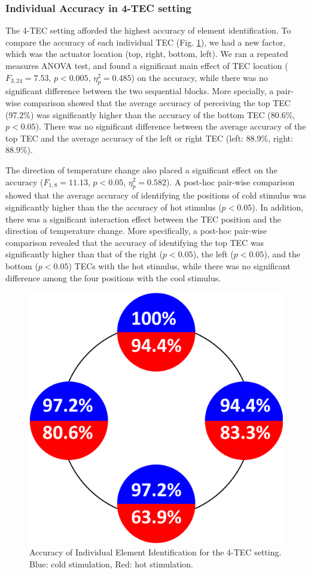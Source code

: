 \documentclass[preprint,12pt]{elsarticle}
\begin{document}
\subsubsection{Individual Accuracy in 4-TEC setting}
The 4-TEC setting afforded the highest accuracy of element identification. To compare the accuracy of each individual TEC (Fig. \ref{fig:7}), we had a new factor, which was the actuator location (top, right, bottom, left).
We ran a repeated measures ANOVA test, and found a significant main effect of TEC location ($F_{3,24} = 7.53$, $p < 0.005$, $\eta_p^2 = 0.485$) on the accuracy, while there was no significant difference between the two sequential blocks.
More specially, a pair-wise comparison showed that the average accuracy of perceiving the top TEC (97.2\%) was significantly higher than the accuracy of the bottom TEC (80.6\%, $p < 0.05$).
There was no significant difference between the average accuracy of the top TEC and the average accuracy of the left or right TEC (left: 88.9\%, right: 88.9\%).

The direction of temperature change also placed a significant effect on the accuracy ($F_{1,8} = 11.13$, $p < 0.05$, $\eta_p^2 = 0.582$).
A post-hoc pair-wise comparison showed that the average accuracy of identifying the positions of cold stimulus was significantly higher than the the accuracy of hot stimulus ($p < 0.05$).
In addition, there was a significant interaction effect between the TEC position and the direction of temperature change. More specifically, a post-hoc pair-wise comparison revealed that the accuracy of identifying the top TEC was significantly higher than that of the right ($p < 0.05$), the left ($p < 0.05$), and the bottom ($p < 0.05$) TECs with the hot stimulus, while there was no significant difference among the four positions with the cool stimulus.

\begin{figure}[h]
  \centering
  \includegraphics[width=0.4\columnwidth]{img/fig7.pdf}
  \caption{Accuracy of Individual Element Identification for the 4-TEC setting. Blue: cold stimulation, Red: hot stimulation.}
  \label{fig:7}
\end{figure}
\end{document}
